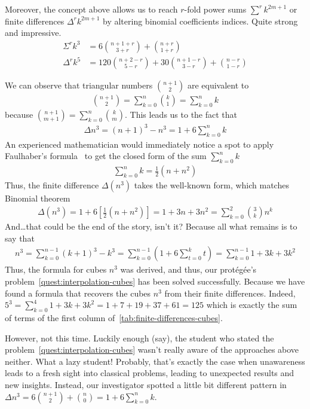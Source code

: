 Moreover, the concept above allows us to reach $r$-fold power sums $\sum^r k^{2m+1}$
or finite differences $\Delta^r k^{2m+1}$ by altering binomial coefficients indices.
Quite strong and impressive.
\begin{align*}
    \Sigma^{r} k^3 &=  6 \binom{n+1+r}{3+r} + \binom{n+r}{1+r} \\
    \Delta^{r} k^5 &= 120 \binom{n+2-r}{5-r} + 30 \binom{n+1-r}{3-r} + \binom{n-r}{1-r}
\end{align*}

We can observe that triangular numbers $\binom{n+1}{2}$ are equivalent to
\begin{align*}
    \binom{n+1}{2} = \sum_{k=0}^{n} \binom{k}{1} = \sum_{k=0}^{n} k
\end{align*}
because $\binom{n+1}{m+1} = \sum_{k=0}^{n} \binom{k}{m}$.
This leads us to the fact that
\begin{align*}
    \Delta n^3 = (n+1)^3 - n^3 = 1 + 6 \sum_{k=0}^{n} k
\end{align*}
An experienced mathematician would immediately notice a spot to apply Faulhaber's formula~\cite{beardon1996sums}
to get the closed form of the sum $\sum_{k=0}^{n} k$
\begin{align*}
    \sum_{k=0}^{n} k = \frac{1}{2}(n+n^2)
\end{align*}
Thus, the finite difference $\Delta(n^3)$ takes the well-known form,
which matches Binomial theorem~\cite{abramowitz1988handbook}
\begin{align*}
    \Delta(n^3)
    = 1 + 6 \left[ \frac{1}{2}(n+n^2) \right]
    = 1 + 3 n + 3 n^2
    = \sum_{k=0}^{2} \binom{3}{k} n^k
\end{align*}
And\ldots that could be the end of the story, isn't it?
Because all what remains is to say that
\begin{align*}
    n^3
    = \sum_{k=0}^{n-1} (k+1)^3 - k^3
    = \sum_{k=0}^{n-1} \left( 1 + 6 \sum_{t=0}^{k} t \right)
    = \sum_{k=0}^{n-1} 1 + 3 k + 3 k^2
\end{align*}
Thus, the formula for cubes $n^3$ was derived, and thus,
our protégée's problem~\eqref{quest:interpolation-cubes} has been solved successfully.
Because we have found a formula that recovers the cubes $n^3$ from their finite differences.
Indeed, $5^3 = \sum_{k=0}^{4} 1 + 3 k + 3 k^2 = 1 + 7 + 19 + 37 + 61 = 125$ which is exactly
the sum of terms of the first column of~\eqref{tab:finite-differences-cubes}.

However, not this time.
Luckily enough (say), the student who stated the problem~\eqref{quest:interpolation-cubes}
wasn't really aware of the approaches above neither.
What a lazy student!
Probably, that's exactly the case when unawareness leads to a fresh sight into classical problems,
leading to unexpected results and new insights.
Instead, our investigator spotted a little bit different pattern in
$\Delta n^3= 6 \binom{n+1}{2} + \binom{n}{0} = 1 +  6 \sum_{k=0}^{n} k$.

